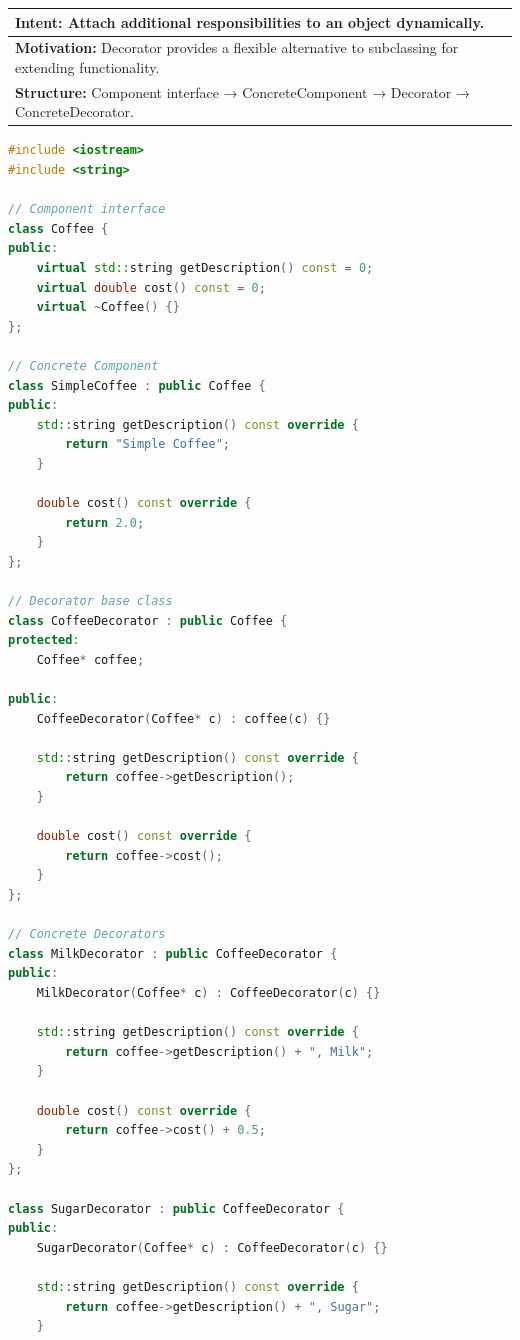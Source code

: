 \documentclass[12pt,a4paper]{article}
\begin{document}
\begin{tabular}{p{}}
    \hline
    \rowcolor{lightgray}
    \textbf{Intent:} Attach additional responsibilities to an object dynamically. \\
    \hline
    \textbf{Motivation:} Decorator provides a flexible alternative to subclassing for extending functionality. \\
    \hline
    \textbf{Structure:} Component interface → ConcreteComponent → Decorator → ConcreteDecorator. \\
    \hline
\end{tabular}

\vspace{1em}

\begin{lstlisting}[language=C++, caption={Decorator Pattern Implementation in C++}, label=lst:decorator]
#include <iostream>
#include <string>

// Component interface
class Coffee {
public:
    virtual std::string getDescription() const = 0;
    virtual double cost() const = 0;
    virtual ~Coffee() {}
};

// Concrete Component
class SimpleCoffee : public Coffee {
public:
    std::string getDescription() const override {
        return "Simple Coffee";
    }
    
    double cost() const override {
        return 2.0;
    }
};

// Decorator base class
class CoffeeDecorator : public Coffee {
protected:
    Coffee* coffee;
    
public:
    CoffeeDecorator(Coffee* c) : coffee(c) {}
    
    std::string getDescription() const override {
        return coffee->getDescription();
    }
    
    double cost() const override {
        return coffee->cost();
    }
};

// Concrete Decorators
class MilkDecorator : public CoffeeDecorator {
public:
    MilkDecorator(Coffee* c) : CoffeeDecorator(c) {}
    
    std::string getDescription() const override {
        return coffee->getDescription() + ", Milk";
    }
    
    double cost() const override {
        return coffee->cost() + 0.5;
    }
};

class SugarDecorator : public CoffeeDecorator {
public:
    SugarDecorator(Coffee* c) : CoffeeDecorator(c) {}
    
    std::string getDescription() const override {
        return coffee->getDescription() + ", Sugar";
    }
    

\end{lstlisting}
\end{document}
